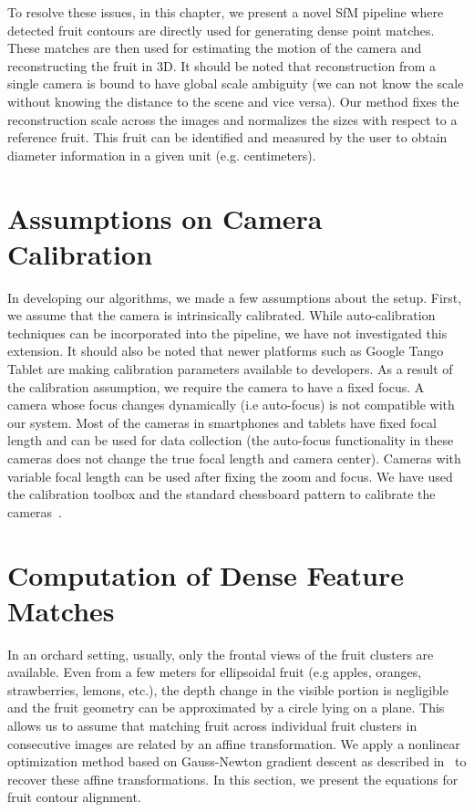 To resolve these issues, in this chapter, we present a novel SfM pipeline where detected fruit contours are directly used for generating dense point matches. These matches are then used for estimating the motion of the camera and reconstructing the fruit in 3D. It should be noted that reconstruction from a single camera is bound to have global scale ambiguity (we can not know the scale without knowing the distance to the scene and vice versa). Our method fixes the reconstruction scale across the images and normalizes the sizes with respect to a reference fruit. This fruit can be identified and measured by the user to obtain diameter information in a given unit (e.g. centimeters).

\section{Assumptions on Camera Calibration}
In developing our algorithms, we made a few assumptions about the setup. First, we assume that the camera is intrinsically calibrated. While auto-calibration techniques can be incorporated into
the pipeline, we have not investigated this extension. It should also be noted that newer platforms such as Google Tango Tablet are making calibration parameters available to developers. As a result of the calibration assumption, we require the camera to have a fixed focus. A camera whose focus changes dynamically (i.e auto-focus) is not compatible with our system.  Most of the cameras in smartphones and tablets have fixed focal length and can be used for data collection (the auto-focus functionality in these cameras does not change the true focal length and camera center).  Cameras with variable focal length can be used after fixing the zoom and focus.  We have used the calibration toolbox and the standard chessboard pattern to calibrate the cameras~\cite{camcalib}.


\section{Computation of Dense Feature Matches} \label{sec:affinetrans}

In an orchard setting, usually, only the frontal views of the fruit clusters are available. Even from a few meters for ellipsoidal fruit (e.g apples, oranges, strawberries, lemons, etc.), the depth change in the visible portion is negligible and the fruit geometry can be approximated by a circle lying on a plane. This allows us to assume that matching fruit across individual fruit clusters in consecutive images are related by an affine transformation. We apply a nonlinear optimization method based on Gauss-Newton gradient descent as described in~\cite{Kannade} to recover these affine transformations. In this section, we present the equations for fruit contour alignment.

